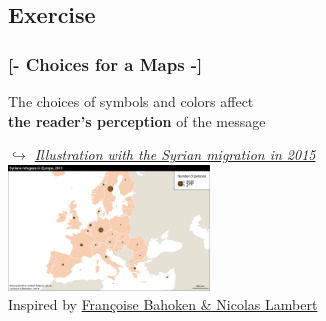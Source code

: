 \documentclass[xcolor=x11names,aspectratio=169, compress]{beamer}
\renewcommand{\(}{\begin{columns}}
\renewcommand{\)}{\end{columns}}
\newcommand{\<}[1]{\begin{column}{#1}}
\renewcommand{\>}{\end{column}}
\begin{document}
\begin{frame}
\begin{itemize}

\end{itemize}
\end{frame}


\subsection{Exercise}
\begin{frame} %
\frametitle{\textcolor{brique}{[-  \textbf{Choices for a Maps} -]}}
\begin{center}
    \Large{\textcolor{siap}{The choices of symbols and colors affect \\
     \textbf{the reader's perception} of the message}} \\ \vspace{0.5cm}

    \large{\textcolor{siap}{\textit{$\hookrightarrow$
    \href{https://observablehq.com/@xtopheb/visualizing-statistics-on-maps}{Illustration with the Syrian migration in 2015}}}} \\ \vspace{0.5cm}
     \href{https://observablehq.com/@xtopheb/visualizing-statistics-on-maps}{\includegraphics[width = 0.4\textwidth]{Syrians-MapSize1.png}}\\
     \hfill\textcolor{gris}{ \footnotesize{Inspired by \href{https://neocarto.github.io/syrians/}{Françoise Bahoken \& Nicolas Lambert}}}
\end{center}
\end{frame}
\end{document}
